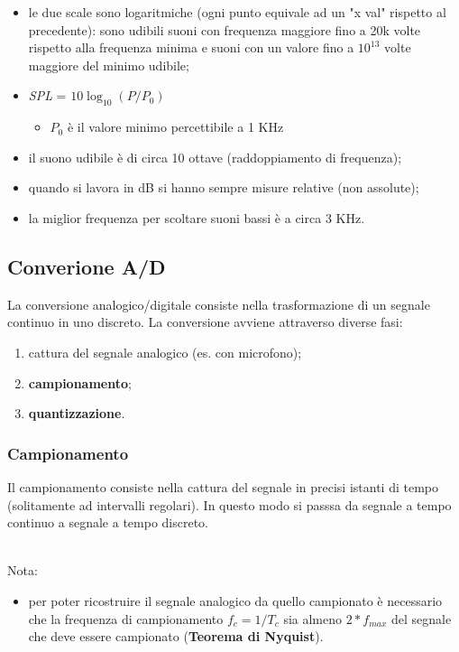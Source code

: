 \documentclass{article}
\begin{document}
			\begin{itemize}
				\item le due scale sono logaritmiche (ogni punto equivale ad un "x val" rispetto al precedente): sono udibili suoni con frequenza maggiore fino a 20k volte rispetto alla frequenza minima e suoni con un valore fino a $10^{13}$ volte maggiore del minimo udibile;
				\item \textit{SPL} = $10\log_{10}(P/P_{0})$
				\begin{itemize}
					\item $P_{0}$ è il valore minimo percettibile a 1 KHz
				\end{itemize}
				\item il suono udibile è di circa 10 ottave (raddoppiamento di frequenza);
				\item quando si lavora in dB si hanno sempre misure relative (non assolute);
				\item la miglior frequenza per scoltare suoni bassi è a circa 3 KHz.
			\end{itemize}
	
		\newpage
		\subsection{Converione A/D}
			La conversione analogico/digitale consiste nella trasformazione di un segnale continuo in uno discreto. La conversione avviene attraverso diverse fasi:
			\begin{enumerate}
				\item cattura del segnale analogico (es. con microfono);
				\item \textbf{campionamento};
				\item \textbf{quantizzazione}.
			\end{enumerate}

			\subsubsection{Campionamento}
				Il campionamento consiste nella cattura del segnale in precisi istanti di tempo (solitamente ad intervalli regolari). In questo modo si passsa da segnale a tempo continuo a segnale a tempo discreto.
				\begin{figure}[ht!]
				\end{figure}
				\\Nota:
				\begin{itemize}
					\item per poter ricostruire il segnale analogico da quello campionato è necessario che la frequenza di campionamento \textit{$f_{c} = 1/T_{c}$} sia almeno \textit{$2 * f_{max}$} del segnale che deve essere campionato (\textbf{Teorema di Nyquist}).
				\end{itemize}
\end{document}
